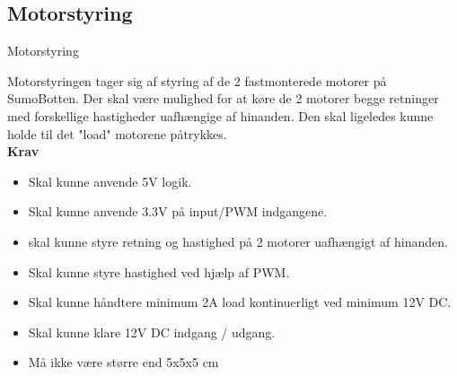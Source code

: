 \tbr
\subsection{Motorstyring}

\begin{PartBlokDescription}{Motorstyring}{}

\end{PartBlokDescription}

Motorstyringen tager sig af styring af de 2 fastmonterede motorer på SumoBotten. Der skal være mulighed for at køre de 2 motorer begge retninger med forskellige hastigheder uafhængige af hinanden. Den skal ligeledes kunne holde til det "load" motorene påtrykkes.
\\
\textbf{Krav}
\begin{itemize}
\item Skal kunne anvende 5V logik.
\item Skal kunne anvende 3.3V på input/PWM indgangene.
\item skal kunne styre retning og hastighed på 2 motorer uafhængigt af hinanden.
\item Skal kunne styre hastighed ved hjælp af PWM.
\item Skal kunne håndtere minimum 2A load kontinuerligt ved minimum 12V DC.
\item Skal kunne klare 12V DC indgang / udgang. 
\item Må ikke være større end 5x5x5 cm
\end{itemize}


